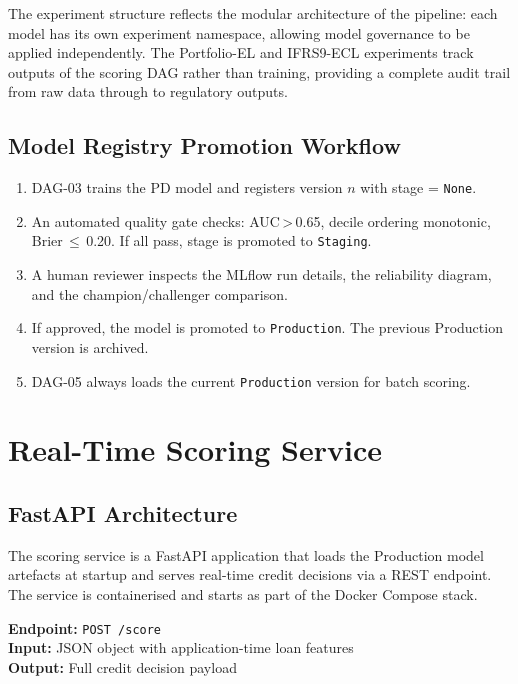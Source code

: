 \documentclass[12pt,a4paper]{report}
\begin{document}
\medskip
\noindent The experiment structure reflects the modular architecture of the pipeline: each model has its own experiment namespace, allowing model governance to be applied independently. The Portfolio-EL and IFRS9-ECL experiments track outputs of the scoring DAG rather than training, providing a complete audit trail from raw data through to regulatory outputs.

\section{Model Registry Promotion Workflow}

\begin{enumerate}
  \item DAG-03 trains the PD model and registers version $n$ with stage = \texttt{None}.
  \item An automated quality gate checks: AUC\,>\,0.65, decile ordering monotonic, Brier\,$\leq$\,0.20. If all pass, stage is promoted to \texttt{Staging}.
  \item A human reviewer inspects the MLflow run details, the reliability diagram, and the champion/challenger comparison.
  \item If approved, the model is promoted to \texttt{Production}. The previous Production version is archived.
  \item DAG-05 always loads the current \texttt{Production} version for batch scoring.
\end{enumerate}

\chapter{Real-Time Scoring Service}
\label{ch:serving}

\section{FastAPI Architecture}

The scoring service is a FastAPI application that loads the Production model artefacts at startup and serves real-time credit decisions via a REST endpoint. The service is containerised and starts as part of the Docker Compose stack.

\textbf{Endpoint:} \texttt{POST /score}\\
\textbf{Input:} JSON object with application-time loan features\\
\textbf{Output:} Full credit decision payload
\end{document}
